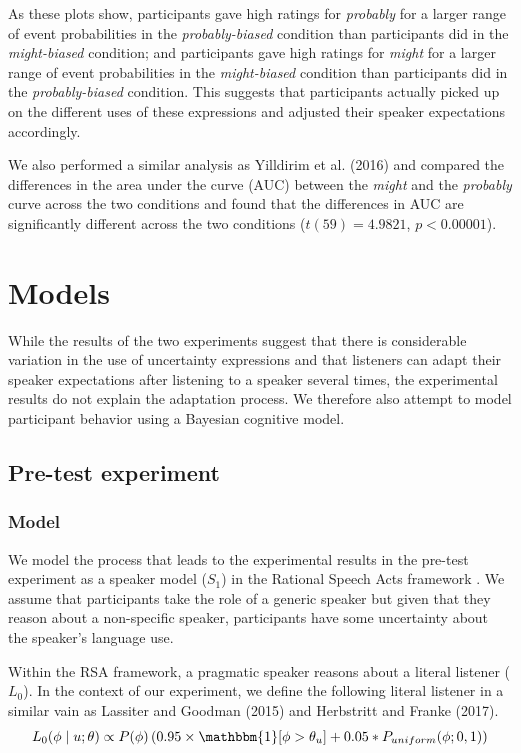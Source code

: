 \documentclass[lucida,biblatex]{sp} %
\begin{document}
As these plots show, participants gave high ratings for \textit{probably} for a larger range of event probabilities in the \textit{probably-biased} condition than participants did in the \textit{might-biased} condition; and participants gave high ratings for \textit{might} for a larger range of event probabilities in the \textit{might-biased} condition than participants did in the \textit{probably-biased} condition. This suggests that participants actually picked up on the different uses of these expressions and adjusted their speaker expectations accordingly.

We also performed a similar analysis as Yilldirim et al. (2016) and compared the differences in the area under the curve (AUC) between the \textit{might} and the \textit{probably} curve across the two conditions and found that the differences in AUC are significantly different across the two conditions ($t(59) = 4.9821$, $p < 0.00001$). 

\section{Models}

While the results of the two experiments suggest that there is considerable variation in the use of uncertainty expressions and that listeners can adapt their speaker expectations after listening to a speaker several times, the experimental results do not explain the adaptation process. We therefore also attempt to model participant behavior using a Bayesian cognitive model.

\subsection{Pre-test experiment}

\subsubsection{Model}

We model the process that leads to the experimental results in the pre-test experiment as a speaker model ($S_1$) in the Rational Speech Acts framework \citep{RSA}. We assume that participants take the role of a generic speaker but given that they reason about a non-specific speaker, participants have some uncertainty about the speaker's language use.

Within the RSA framework, a pragmatic speaker reasons about a literal listener ($L_0$). In the context of our experiment, we define the following literal listener in a similar vain as Lassiter and Goodman (2015) and Herbstritt and Franke (2017). 
$$L_0(\phi \mid u; \theta) \propto P(\phi) \left( {0.95} \times \mathbbm{1}[\phi > \theta_{u}] + 0.05 * P_{uniform}(\phi; 0,1) \right)$$
\end{document}
